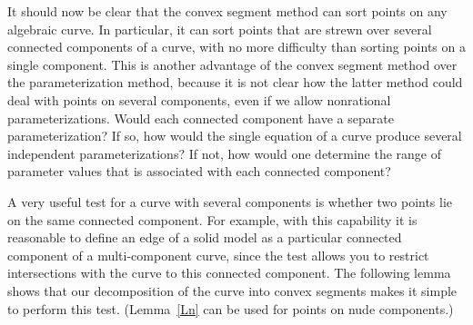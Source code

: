 It should now be clear that the convex segment method can sort points on any
algebraic curve.
In particular, it can sort points that are strewn over several connected 
components of a curve, with no more difficulty than sorting points on a single
component.
This is another advantage of the convex segment method over the parameterization
method, because it is not clear how the latter method could deal with points
on several components, even if we allow nonrational parameterizations.
%
%
Would each connected component have a separate parameterization?
If so, how would the single equation of a curve produce several independent 
parameterizations?
If not, how would one determine the range of parameter values that is associated 
with each connected component?

A very useful test for a curve with several components is whether two points 
lie on the same connected component.
For example, with this capability it is reasonable to define an edge of a solid model 
as a particular connected component of a multi-component curve, since the test allows 
you to restrict intersections with the curve to this connected component.
The following lemma shows that our decomposition of 
the curve into convex segments makes it simple to perform this test.
(Lemma~\ref{Ln} can be used for points on nude components.)

